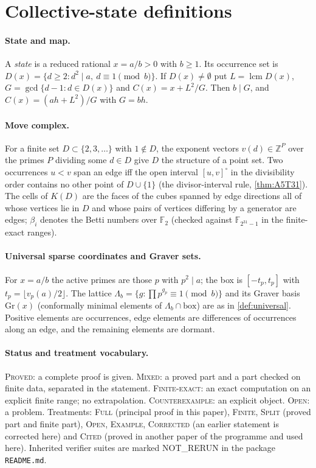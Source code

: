 \section{Collective-state definitions}\label{app:definitions}
\paragraph{State and map.} A \emph{state} is a reduced rational $x=a/b>0$ with $b\ge1$. Its occurrence set is $D(x)=\{d\ge2: d^2\mid a,\ d\equiv1 \pmod b\}$. If $D(x)\ne\emptyset$ put $L=\operatorname{lcm}D(x)$, $G=\gcd\{d-1:d\in D(x)\}$ and $C(x)=x+L^2/G$. Then $b\mid G$, and $C(x)=(ah+L^2)/G$ with $G=bh$.
\paragraph{Move complex.} For a finite set $D\subset\{2,3,\dots\}$ with $1\notin D$, the exponent vectors $v(d)\in\mathbb Z^P$ over the primes $P$ dividing some $d\in D$ give $D$ the structure of a point set. Two occurrences $u<v$ span an edge iff the open interval $[u,v]^\circ$ in the divisibility order contains no other point of $D\cup\{1\}$ (the divisor-interval rule, \cref{thm:A5T31}). The cells of $K(D)$ are the faces of the cubes spanned by edge directions all of whose vertices lie in $D$ and whose pairs of vertices differing by a generator are edges; $\beta_i$ denotes the Betti numbers over $\mathbb F_2$ (checked against $\mathbb F_{2^{31}-1}$ in the finite-exact ranges).
\paragraph{Universal sparse coordinates and Graver sets.} For $x=a/b$ the active primes are those $p$ with $p^2\mid a$; the box is $[-t_p,t_p]$ with $t_p=\lfloor v_p(a)/2\rfloor$. The lattice $\Lambda_b=\{g:\prod p^{g_p}\equiv1\pmod b\}$ and its Graver basis $\mathrm{Gr}(x)$ (conformally minimal elements of $\Lambda_b\cap\mathrm{box}$) are as in \cref{def:universal}. Positive elements are occurrences, edge elements are differences of occurrences along an edge, and the remaining elements are dormant.
\paragraph{Status and treatment vocabulary.} \textsc{Proved}: a complete proof is given. \textsc{Mixed}: a proved part and a part checked on finite data, separated in the statement. \textsc{Finite-exact}: an exact computation on an explicit finite range; no extrapolation. \textsc{Counterexample}: an explicit object. \textsc{Open}: a problem. Treatments: \textsc{Full} (principal proof in this paper), \textsc{Finite}, \textsc{Split} (proved part and finite part), \textsc{Open}, \textsc{Example}, \textsc{Corrected} (an earlier statement is corrected here) and \textsc{Cited} (proved in another paper of the programme and used here). Inherited verifier suites are marked \textsc{NOT\_RERUN} in the package \texttt{README.md}.
